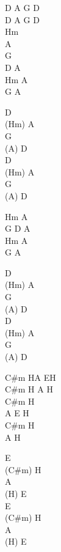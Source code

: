 \begin{chord}
D A G D\\
D A G D\\
Hm\\
A\\
G\\
D A\\
Hm A\\
G A

D\\
(Hm) A\\
G\\
(A) D\\
D\\
(Hm) A\\
G\\
(A) D

Hm A\\
G D A\\
Hm A\\
G A

D\\
(Hm) A\\
G\\
(A) D\\
D\\
(Hm) A\\
G\\
(A) D

C#m HA EH\\
C#m H A H\\
C#m H\\
A E H\\
C#m H\\
A H

E\\
(C#m) H\\
A\\
(H) E\\
E\\
(C#m) H\\
A\\
(H) E
\end{chord}
